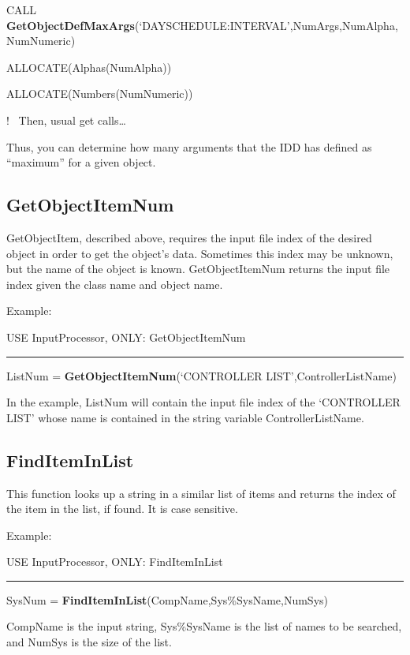 CALL \textbf{GetObjectDefMaxArgs}(`DAYSCHEDULE:INTERVAL',NumArgs,NumAlpha,NumNumeric)

ALLOCATE(Alphas(NumAlpha))

ALLOCATE(Numbers(NumNumeric))

!~ Then, usual get calls\ldots{}

Thus, you can determine how many arguments that the IDD has defined as ``maximum'' for a given object.

\subsection{GetObjectItemNum}\label{getobjectitemnum}

GetObjectItem, described above, requires the input file index of the desired object in order to get the object's data. Sometimes this index may be unknown, but the name of the object is known. GetObjectItemNum returns the input file index given the class name and object name.

Example:

USE InputProcessor, ONLY: GetObjectItemNum

\begin{center}\rule{0.5\linewidth}{0.4pt}\end{center}

ListNum = \textbf{GetObjectItemNum}(`CONTROLLER LIST',ControllerListName)

In the example, ListNum will contain the input file index of the `CONTROLLER LIST' whose name is contained in the string variable ControllerListName.

\subsection{FindItemInList}\label{finditeminlist}

This function looks up a string in a similar list of items and returns the index of the item in the list, if found. It is case sensitive.

Example:

USE InputProcessor, ONLY: FindItemInList

\begin{center}\rule{0.5\linewidth}{0.4pt}\end{center}

SysNum = \textbf{FindItemInList}(CompName,Sys\%SysName,NumSys)

CompName is the input string, Sys\%SysName is the list of names to be searched, and NumSys is the size of the list.

